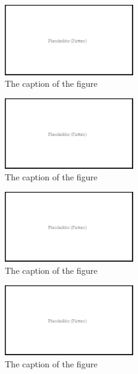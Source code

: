 \documentclass[12pt, oneside]{report}
\begin{document}
\begin{figure}[h]
  \centering
  \includegraphics[width=0.5\textwidth]{figures/pictures/placeholder}
  \caption{The caption of the figure}
  \label{fig:BlockDiagram4}
\end{figure}

\begin{figure}[h]
  \centering
  \includegraphics[width=0.5\textwidth]{figures/pictures/placeholder}
  \caption{The caption of the figure}
  \label{fig:BlockDiagram4}
\end{figure}

\begin{figure}[h]
  \centering
  \includegraphics[width=0.5\textwidth]{figures/pictures/placeholder}
  \caption{The caption of the figure}
  \label{fig:BlockDiagram4}
\end{figure}

\begin{figure}[h]
  \centering
  \includegraphics[width=0.5\textwidth]{figures/pictures/placeholder}
  \caption{The caption of the figure}
  \label{fig:BlockDiagram4}
\end{figure}
\end{document}
